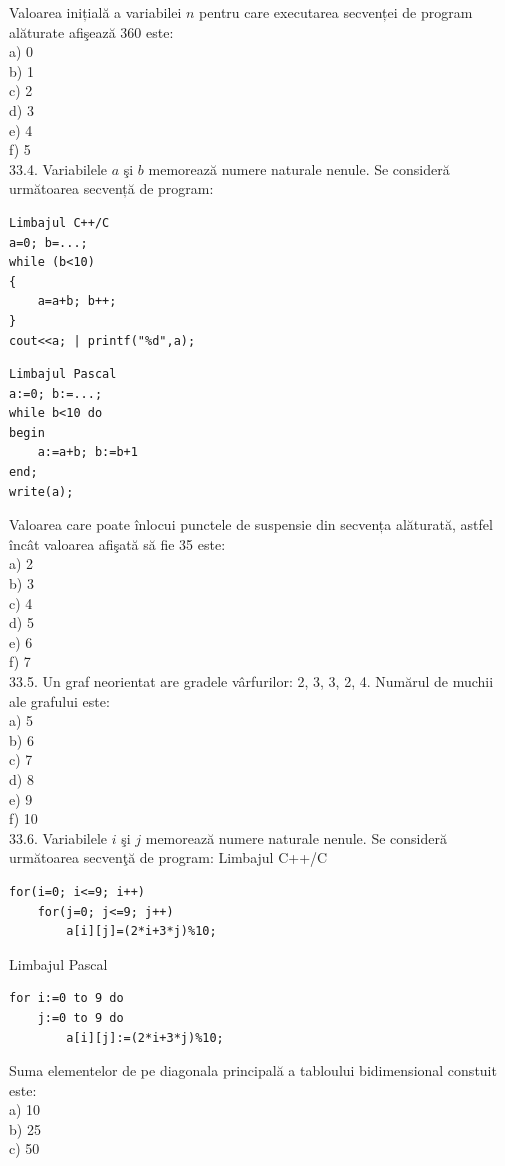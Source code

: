 \begin{itemize}
\begin{enumerate}
Valoarea inițială a variabilei $n$ pentru care executarea secvenței de program alăturate afişează 360 este:
\\
a) 0
\\
b) 1
\\
c) 2
\\
d) 3
\\
e) 4
\\
f) 5
\\
33.4. Variabilele $a$ şi $b$ memorează numere naturale nenule. Se consideră următoarea secvență de program:
\begin{verbatim}
Limbajul C++/C
a=0; b=...;
while (b<10)
{
    a=a+b; b++;
}
cout<<a; | printf("%d",a);
\end{verbatim}
\begin{verbatim}
Limbajul Pascal
a:=0; b:=...;
while b<10 do
begin
    a:=a+b; b:=b+1
end;
write(a);
\end{verbatim}
Valoarea care poate înlocui punctele de suspensie din secvența alăturată, astfel încât valoarea afişată să fie 35 este:
\\
a) 2
\\
b) 3
\\
c) 4
\\
d) 5
\\
e) 6
\\
f) 7
\\
33.5. Un graf neorientat are gradele vârfurilor: 2, 3, 3, 2, 4. Numărul de muchii ale grafului este:
\\
a) 5
\\
b) 6
\\
c) 7
\\
d) 8
\\
e) 9
\\
f) 10
\\
33.6. Variabilele $i$ şi $j$ memorează numere naturale nenule. Se consideră următoarea secvenţă de program:
Limbajul C++/C
\begin{verbatim}
for(i=0; i<=9; i++)
    for(j=0; j<=9; j++)
        a[i][j]=(2*i+3*j)%10;
\end{verbatim}
Limbajul Pascal
\begin{verbatim}
for i:=0 to 9 do
    j:=0 to 9 do
        a[i][j]:=(2*i+3*j)%10;
\end{verbatim}
Suma elementelor de pe diagonala principală a tabloului bidimensional constuit este:
\\
a) 10
\\
b) 25
\\
c) 50
\\

\end{enumerate}
\end{itemize}
